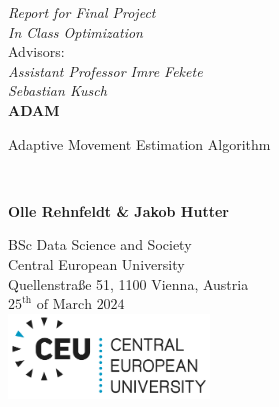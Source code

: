 \documentclass[oneside]{article}
\begin{document}
\begin{titlepage}
   \begin{center}
        \vfill
        \textit{Report for Final Project}\\
        \textit{In Class Optimization}\\
        \vspace{0.5cm}
        Advisors:\\
        \textit{Assistant Professor Imre Fekete}\\
        \textit{Sebastian Kusch}
        \vfill\noindent\hrulefill \\
        \vspace*{1cm}
        \textbf{\huge ADAM}\\
        \vspace{0.5cm}
        
         Adaptive Movement Estimation Algorithm
        
        \noindent\hrulefill \\

       
            
       \vspace{1.5cm}

       \textbf{Olle Rehnfeldt \& Jakob Hutter}

       \vfill
            
       
            
       \vspace{2cm}
       BSc Data Science and Society\\
       Central European University\\
       Quellenstraße 51, 1100 Vienna, Austria\\
       $25^{\text{th}}\text{ of March } 2024$\\
       \vspace{1.5cm}
       \includegraphics[width=0.4\textwidth]{figures/CEU_Logo_RGB_DualColor.png}
       
            
   \end{center}
\end{titlepage}






\pagestyle{fancy}
\end{document}
